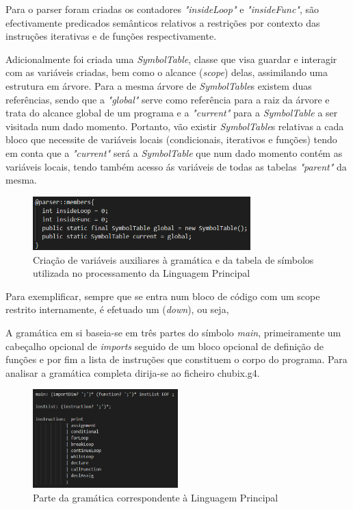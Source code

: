 \documentclass[10pt,portuguese]{article}
\begin{document}
\par Para o parser foram criadas os contadores \emph{"insideLoop"} e \emph{"insideFunc"}, são efectivamente predicados semânticos relativos a restrições por contexto das instruções iterativas e de funções respectivamente.
\par Adicionalmente foi criada uma \emph{SymbolTable}, classe que visa guardar e interagir com as variáveis criadas, bem como o alcance (\emph{scope}) delas, assimilando uma estrutura em árvore. Para a mesma árvore de \emph{SymbolTable}s existem duas referências, sendo que a \emph{"global"} serve como referência para a raiz da árvore e trata do alcance global de um programa e a \emph{"current"} para a \emph{SymbolTable} a ser visitada num dado momento. Portanto, vão existir \emph{SymbolTable}s relativas a cada bloco que necessite de variáveis locais (condicionais, iterativos e funções) tendo em conta que a \emph{"current"} será a \emph{SymbolTable} que num dado momento contém as variáveis locais, tendo também acesso ás variáveis de todas as tabelas \emph{"parent"} da mesma.
\begin{figure}[h]
\centering
\includegraphics[width=0.75\textwidth]{images/parserchubix.png}
\caption{Criação de variáveis auxiliares à gramática e da tabela de símbolos utilizada no processamento da Linguagem Principal}
\end{figure}
\par Para exemplificar, sempre que se entra num bloco de código com um scope restrito internamente,
é efetuado um (\emph{down}), ou seja, 
\par A gramática em si baseia-se em três partes do símbolo \emph{main}, primeiramente um cabeçalho opcional de \emph{imports} seguido de um bloco opcional de definição de funções e por fim a lista de instruções que constituem o corpo do programa. Para analisar a gramática completa dirija-se ao ficheiro chubix.g4.

\begin{figure}[h]
\centering
\includegraphics[width=0.5\textwidth]{images/mainchubix.png}
\caption{Parte da gramática correspondente à Linguagem Principal}
\end{figure}
\end{document}
